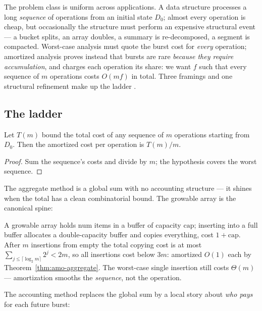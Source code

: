The problem class is uniform across applications. A data structure processes
a long \emph{sequence} of operations from an initial state $D_0$; almost
every operation is cheap, but occasionally the structure must perform an
expensive structural event --- a bucket splits, an array doubles, a summary
is re-decomposed, a segment is compacted. Worst-case analysis must quote the
burst cost for \emph{every} operation; amortized analysis proves instead
that bursts are rare \emph{because they require accumulation}, and charges
each operation its share: we want $f$ such that every sequence of $m$
operations costs $O(mf)$ in total. Three framings and one structural
refinement make up the ladder
\citep{amortized-potential-bg3,amortized-potential-bg1}.

\subsection{The ladder}
\label{sec:amo-ladder}

\begin{theorem}\label{thm:amo-aggregate}
Let $T(m)$ bound the total cost of any sequence of $m$ operations starting
from $D_0$. Then the amortized cost per operation is $T(m)/m$. \eop
\end{theorem}

\begin{proof}
Sum the sequence's costs and divide by $m$; the hypothesis covers the worst sequence.
\end{proof}

The aggregate method is a global sum with no accounting structure --- it
shines when the total has a clean combinatorial bound. The growable array is
the canonical spine:

\begin{example}\label{ex:amo-table}
A growable array holds $\mathrm{num}$ items in a buffer of capacity
$\mathrm{cap}$; inserting into a full buffer allocates a double-capacity
buffer and copies everything, cost $1 + \mathrm{cap}$. After $m$ insertions
from empty the total copying cost is at most
$\sum_{j \le \lceil \log_2 m \rceil} 2^j < 2m$, so all insertions cost below
$3m$: amortized $O(1)$ each by Theorem~\ref{thm:amo-aggregate}. The
worst-case single insertion still costs $\Theta(m)$ --- amortization smooths
the \emph{sequence}, not the operation.
\end{example}

The accounting method replaces the global sum by a local story about \emph{who
pays} for each future burst:

